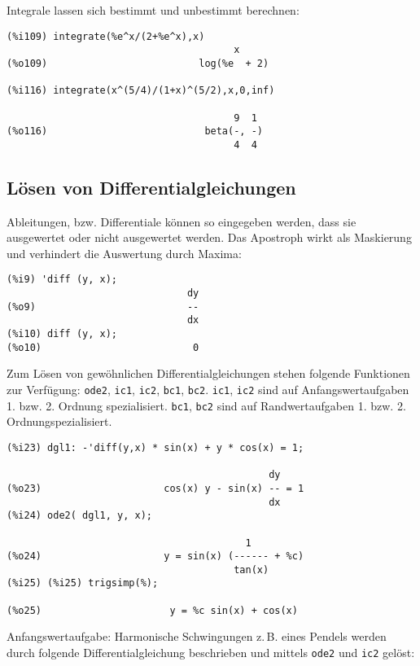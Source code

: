 \documentclass[ngerman,12pt]{scrartcl}
\newcommand*\zB{z.\,B.\xspace}
\begin{document}
Integrale lassen sich bestimmt und unbestimmt berechnen:

\begin{verbatim}
(%i109) integrate(%e^x/(2+%e^x),x)
                                       x
(%o109)                          log(%e  + 2)

(%i116) integrate(x^(5/4)/(1+x)^(5/2),x,0,inf)

                                       9  1
(%o116)                           beta(-, -)
                                       4  4
\end{verbatim}

\subsection{Lösen von Differentialgleichungen}

Ableitungen, bzw. Differentiale können so eingegeben werden, dass sie
ausgewertet oder nicht ausgewertet werden.  Das Apostroph wirkt als
Maskierung und verhindert die Auswertung durch Maxima:

\begin{verbatim}
(%i9) 'diff (y, x);
                               dy
(%o9)                          --
                               dx
(%i10) diff (y, x);
(%o10)                          0
\end{verbatim}

Zum Lösen von gewöhnlichen Differentialgleichungen stehen folgende
Funktionen zur Verfügung: \texttt{ode2}, \texttt{ic1}, \texttt{ic2}, \texttt{bc1}, \texttt{bc2}.
\texttt{ic1}, \texttt{ic2} sind auf Anfangswertaufgaben 1. bzw. 2. Ordnung spezialisiert.
\texttt{bc1}, \texttt{bc2} sind auf Randwertaufgaben 1. bzw. 2. Ordnungspezialisiert.

\begin{verbatim}
(%i23) dgl1: -'diff(y,x) * sin(x) + y * cos(x) = 1;

                                             dy
(%o23)                     cos(x) y - sin(x) -- = 1
                                             dx
(%i24) ode2( dgl1, y, x);

                                         1
(%o24)                     y = sin(x) (------ + %c)
                                       tan(x)
(%i25) (%i25) trigsimp(%);

(%o25)                      y = %c sin(x) + cos(x)
\end{verbatim}

Anfangswertaufgabe: Harmonische Schwingungen \zB eines Pendels
werden durch folgende Differentialgleichung beschrieben und mittels
\texttt{ode2} und \texttt{ic2} gelöst:
\end{document}
